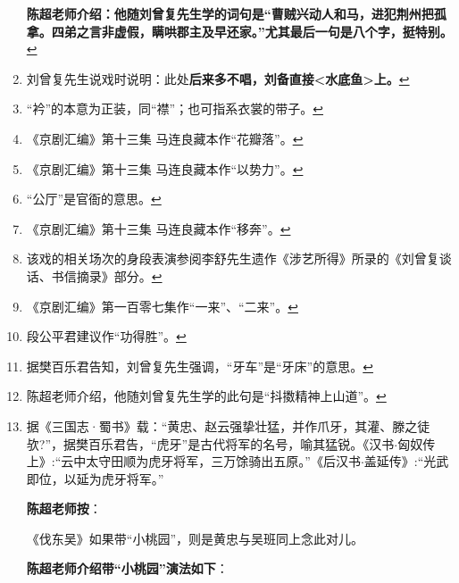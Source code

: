 \begin{enumerate}
  \textbf{陈超老师介绍：他随刘曾复先生学的词句是``曹贼兴动人和马，进犯荆州把孤拿。四弟之言非虚假，瞒哄郡主及早还家。''尤其最后一句是八个字，挺特别。}\protect\hyperlink{fnref188}{↩}
\item
  \leavevmode\hypertarget{fn189}{}%
  刘曾复先生说戏时说明：此处\textbf{后来多不唱，刘备直接\textless{}水底鱼\textgreater{}上。}\protect\hyperlink{fnref189}{↩}
\item
  \leavevmode\hypertarget{fn190}{}%
  ``衿''的本意为正装，同``襟''；也可指系衣裳的带子。\protect\hyperlink{fnref190}{↩}
\item
  \leavevmode\hypertarget{fn191}{}%
  《京剧汇编》第十三集
  马连良藏本作``花瓣落''。\protect\hyperlink{fnref191}{↩}
\item
  \leavevmode\hypertarget{fn192}{}%
  《京剧汇编》第十三集
  马连良藏本作``以势力''。\protect\hyperlink{fnref192}{↩}
\item
  \leavevmode\hypertarget{fn193}{}%
  ``公厅''是官衙的意思。\protect\hyperlink{fnref193}{↩}
\item
  \leavevmode\hypertarget{fn194}{}%
  《京剧汇编》第十三集
  马连良藏本作``移奔''。\protect\hyperlink{fnref194}{↩}
\item
  \leavevmode\hypertarget{fn195}{}%
  该戏的相关场次的身段表演参阅李舒先生遗作《涉艺所得》所录的《刘曾复谈话、书信摘录》部分。\protect\hyperlink{fnref195}{↩}
\item
  \leavevmode\hypertarget{fn196}{}%
  《京剧汇编》第一百零七集作``一来''、``二来''。\protect\hyperlink{fnref196}{↩}
\item
  \leavevmode\hypertarget{fn197}{}%
  段公平君建议作``功得胜''。\protect\hyperlink{fnref197}{↩}
\item
  \leavevmode\hypertarget{fn198}{}%
  据樊百乐君告知，刘曾复先生强调，``牙车''是``牙床''的意思。\protect\hyperlink{fnref198}{↩}
\item
  \leavevmode\hypertarget{fn199}{}%
  陈超老师介绍，他随刘曾复先生学的此句是``抖擞精神上山道''。\protect\hyperlink{fnref199}{↩}
\item
  \leavevmode\hypertarget{fn200}{}%
  据《三国志·蜀书》载：``黄忠、赵云强挚壮猛，并作爪牙，其灌、滕之徒欤?''，据樊百乐{\scriptsize 君}告，``虎牙''是古代将军的名号，喻其猛锐。《汉书$\cdot$匈奴传上》:``云中太守田顺为虎牙将军，三万馀骑出五原。''《后汉书$\cdot$盖延传》:``光武即位，以延为虎牙将军。''

  \textbf{陈超老师按}：

  《伐东吴》如果带``小桃园''，则是黄忠与吴班同上念此对儿。

  \textbf{陈超老师介绍带``小桃园''演法如下}：


\end{enumerate}
